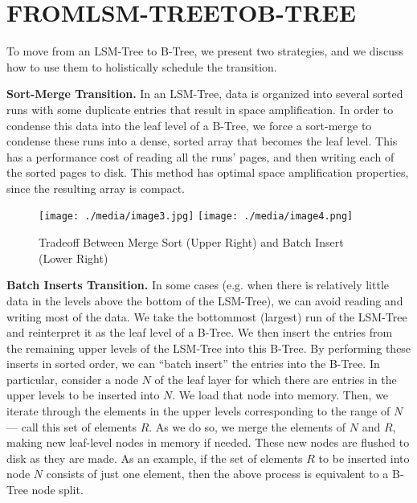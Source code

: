 \documentclass[a4paper,12pt,notitlepage,twoside,openright]{article}
\begin{document}
\hypertarget{fromlsm-treetob-tree}{%
\section{FROMLSM-TREETOB-TREE}\label{fromlsm-treetob-tree}}

To move from an LSM-Tree to B-Tree, we present two strategies, and we
discuss how to use them to holistically schedule the transition.

\textbf{Sort-Merge Transition.} In an LSM-Tree, data is organized into
several sorted runs with some duplicate entries that result in space
amplification. In order to condense this data into the leaf level of a
B-Tree, we force a sort-merge to condense these runs into a dense,
sorted array that becomes the leaf level. This has a performance cost of
reading all the runs' pages, and then writing each of the sorted pages
to disk. This method has optimal space amplification properties, since
the resulting array is compact.

\begin{figure}
  \centering
  \begin{minipage}[t]{0.9\columnwidth}
    \texttt{[image: ./media/image3.jpg]}
    \texttt{[image: ./media/image4.png]}
  \end{minipage}
  \caption{Tradeoff Between Merge Sort (Upper Right) and Batch Insert (Lower Right)}
\end{figure}

\textbf{Batch Inserts Transition.} In some cases (e.g. when there is relatively
little data in the levels above the bottom of the LSM-Tree), we can
avoid reading and writing most of the data. We take the bottommost
(largest) run of the LSM-Tree and reinterpret it as the leaf level of a
B-Tree. We then insert the entries from the remaining upper levels of
the LSM-Tree into this B-Tree. By performing these inserts in sorted
order, we can ``batch insert'' the entries into the B-Tree. In
particular, consider a node \(N\) of the leaf layer for which there
are entries in the upper levels to be inserted into \(N\). We load
that node into memory. Then, we iterate through the elements in the
upper levels corresponding to the range of \(N\) --- call this set of
elements \(R\). As we do so, we merge the elements of \(N\) and
\(R\), making new leaf-level nodes in memory if needed. These new
nodes are flushed to disk as they are made. As an example, if the set of
elements \(R\) to be inserted into node \(N\) consists of just one
element, then the above process is equivalent to a B-Tree node split.
\end{document}

